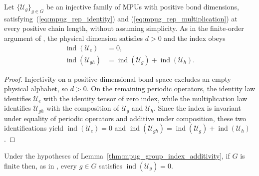 \begin{lemma}
    \label{thm:mpug_group_index_additivity}
    \leanok
    Let $\{\mathcal U_g\}_{g\in G}$ be an injective family of MPUs with positive
    bond dimensions, satisfying~(\ref{eq:mpug_rep_identity}) and
    (\ref{eq:mpug_rep_multiplication}) at every positive chain length, without
    assuming simplicity. As in the finite-order argument of
    \cite[line~1547]{FrancoRubio2025MPUGauging}, the physical dimension satisfies
    $d>0$ and the index obeys
    \begin{align}
        \operatorname{ind}(\mathcal U_e) & =0,                                                                 \\
        \operatorname{ind}(\mathcal U_{gh})
                                         & =\operatorname{ind}(\mathcal U_g)+\operatorname{ind}(\mathcal U_h).
    \end{align}
\end{lemma}

\begin{proof}\leanok
    Injectivity on a positive-dimensional bond space excludes an empty
    physical alphabet, so $d>0$. On the remaining periodic operators, the
    identity law identifies $\mathcal U_e$ with the identity tensor of zero
    index, while the multiplication law identifies $\mathcal U_{gh}$ with the
    composition of $\mathcal U_g$ and $\mathcal U_h$. Since the index is
    invariant under equality of periodic operators and additive under
    composition, these two identifications yield
    $\operatorname{ind}(\mathcal U_e)=0$ and
    $\operatorname{ind}(\mathcal U_{gh})=\operatorname{ind}(\mathcal U_g)+\operatorname{ind}(\mathcal U_h)$.
\end{proof}

\begin{lemma}
    \label{thm:mpug_finite_group_index_zero}
    \leanok
    Under the hypotheses of Lemma~\ref{thm:mpug_group_index_additivity},
    if $G$ is finite then, as in \cite[line~1547]{FrancoRubio2025MPUGauging},
    every $g\in G$ satisfies $\operatorname{ind}(\mathcal U_g)=0$.
\end{lemma}

